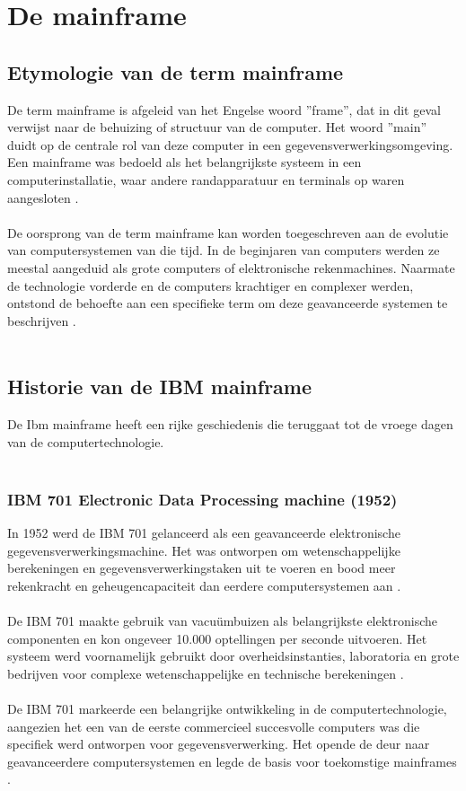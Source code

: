 \section{De mainframe}
\label{sec:de mainframe}

\subsection{Etymologie van de term mainframe}
De term mainframe is afgeleid van het Engelse woord ”frame”, dat in dit geval verwijst naar de behuizing of structuur van de computer. Het woord ”main” duidt op de centrale rol van deze computer in een gegevensverwerkingsomgeving. Een mainframe was bedoeld als het belangrijkste systeem in een computerinstallatie, waar andere randapparatuur en terminals op waren aangesloten \autocite{IBM2024}.
\\ \\
De oorsprong van de term mainframe kan worden toegeschreven aan de evolutie van computersystemen van die tijd. In de beginjaren van computers werden ze meestal aangeduid als grote computers of elektronische rekenmachines. Naarmate de technologie vorderde en de computers krachtiger en complexer werden, ontstond de behoefte aan een specifieke term om deze geavanceerde systemen te beschrijven \autocite{IBM2024}.
\\ \\
\subsection{Historie van de IBM mainframe}
De Ibm mainframe heeft een rijke geschiedenis die teruggaat tot de vroege dagen van de computertechnologie.
\\ \\
\subsubsection{IBM 701 Electronic Data Processing machine (1952)}
In 1952 werd de IBM 701 gelanceerd als een geavanceerde elektronische gegevensverwerkingsmachine. Het was ontworpen om wetenschappelijke berekeningen en gegevensverwerkingstaken uit te voeren en bood meer rekenkracht en geheugencapaciteit dan eerdere computersystemen aan \autocite{IBM2024a}.
\\ \\
De IBM 701 maakte gebruik van vacuümbuizen als belangrijkste elektronische componenten en kon ongeveer 10.000 optellingen per seconde uitvoeren. Het systeem werd voornamelijk gebruikt door overheidsinstanties, laboratoria en grote bedrijven voor complexe wetenschappelijke en technische berekeningen \autocite{IBM2024a}.
\\ \\
De IBM 701 markeerde een belangrijke ontwikkeling in de computertechnologie, aangezien het een van de eerste commercieel succesvolle computers was die specifiek werd ontworpen voor gegevensverwerking. Het opende de deur naar geavanceerdere computersystemen en legde de basis voor toekomstige mainframes .
\\ \\
